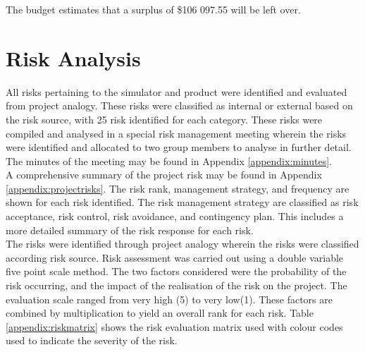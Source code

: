 \noindent
The budget estimates that a surplus of \$106 097.55 will be left over. 

\newpage
\section{Risk Analysis}

All risks pertaining to the simulator and product were identified and evaluated from project analogy. These risks were classified as internal or external based on the risk source, with 25 risk identified for each category. These risks were compiled and analysed in a special risk management meeting wherein the risks were identified and allocated to two group members to analyse in further detail. The minutes of the meeting may be found in Appendix \ref{appendix:minutes}.\\

\noindent
A comprehensive summary of the project risk may be found in Appendix \ref{appendix:projectrisks}. The risk rank, management strategy, and frequency are shown for each risk identified. The risk management strategy are classified as risk acceptance, risk control, risk avoidance, and contingency plan. This includes a more detailed summary of the risk response for each risk.\\

\noindent
The risks were identified through project analogy wherein the risks were classified according risk source. Risk assessment was carried out using a double variable five point scale method. The two factors considered were the probability of the risk occurring, and the impact of the realisation of the risk on the project. The evaluation scale ranged from very high (5) to very low(1). These factors are combined by multiplication to yield an overall rank for each risk. Table \ref{appendix:riskmatrix} shows the risk evaluation matrix used with colour codes used to indicate the severity of the risk. 


